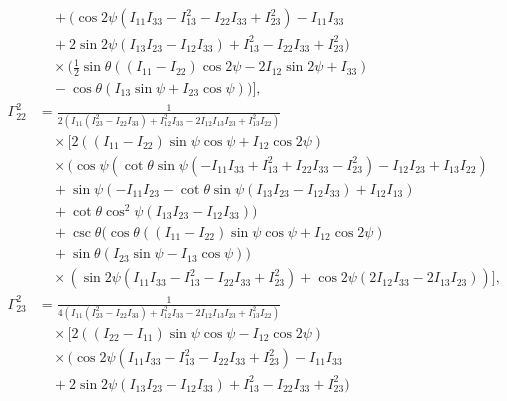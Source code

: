 \documentclass[lineno, pdflatex,sn-mathphys-ay]{sn-jnl}
\theoremstyle{thmstyleone}%
\theoremstyle{thmstyletwo}%
\theoremstyle{thmstylethree}%
\begin{document}
\begin{appendices}
\begin{align}
    &\quad +\Big(\cos 2\psi \left(I_{11} I_{33}-I_{13}^2-I_{22} I_{33}+I_{23}^2\right)-I_{11} I_{33} \nonumber \\
    &\quad +2 \sin 2\psi (I_{13} I_{23}-I_{12} I_{33})+I_{13}^2-I_{22} I_{33}+I_{23}^2\Big) \nonumber \\
    &\quad \times \bigg(\frac{1}{2} \sin \theta ((I_{11}-I_{22}) \cos 2\psi-2 I_{12} \sin 2\psi+I_{33}) \nonumber \\
    &\quad -\cos \theta (I_{13} \sin \psi+I_{23} \cos \psi)\bigg) \bigg], \nonumber \\
    \Gamma^{2}_{22} &= \frac{1}{2 \left(I_{11} \left(I_{23}^2-I_{22} I_{33}\right)+I_{12}^2 I_{33}-2 I_{12} I_{13} I_{23}+I_{13}^2 I_{22}\right)} \nonumber \\
    &\quad \times \bigg[ 2 ((I_{11}-I_{22}) \sin \psi \cos \psi+I_{12} \cos 2\psi) \nonumber \\
    &\quad \times \bigg(\cos \psi \left(\cot \theta \sin \psi \left(-I_{11} I_{33}+I_{13}^2+I_{22} I_{33}-I_{23}^2\right)-I_{12} I_{23}+I_{13} I_{22}\right) \nonumber \\
    &\quad +\sin \psi (-I_{11} I_{23}-\cot \theta \sin \psi (I_{13} I_{23}-I_{12} I_{33})+I_{12} I_{13}) \nonumber \\
    &\quad +\cot \theta \cos ^2\psi (I_{13} I_{23}-I_{12} I_{33})\bigg) \nonumber \\
    &\quad +\csc \theta (\cos \theta ((I_{11}-I_{22}) \sin \psi \cos \psi+I_{12} \cos 2\psi) \nonumber \\
    &\quad +\sin \theta (I_{23} \sin \psi-I_{13} \cos \psi)) \nonumber \\
    &\quad \times \left(\sin 2\psi \left(I_{11} I_{33}-I_{13}^2-I_{22} I_{33}+I_{23}^2\right)+\cos 2\psi (2 I_{12} I_{33}-2 I_{13} I_{23})\right) \bigg], \nonumber \\
    \Gamma^{2}_{23} &= \frac{1}{4 \left(I_{11} \left(I_{23}^2-I_{22} I_{33}\right)+I_{12}^2 I_{33}-2 I_{12} I_{13} I_{23}+I_{13}^2 I_{22}\right)} \nonumber \\
    &\quad \times \bigg[ 2 ((I_{22}-I_{11}) \sin \psi \cos \psi-I_{12} \cos 2\psi) \nonumber \\
    &\quad \times \Big(\cos 2\psi \left(I_{11} I_{33}-I_{13}^2-I_{22} I_{33}+I_{23}^2\right)-I_{11} I_{33} \nonumber \\
    &\quad +2 \sin 2\psi (I_{13} I_{23}-I_{12} I_{33})+I_{13}^2-I_{22} I_{33}+I_{23}^2\Big) \nonumber \\

\end{align}
\end{appendices}
\end{document}
